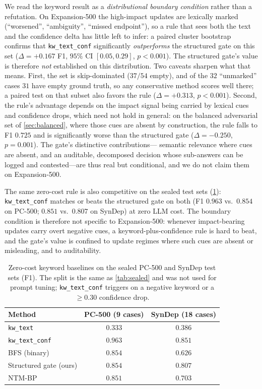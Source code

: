 \documentclass{article}
\theoremstyle{definition}
\begin{document}
We read the keyword result as a \emph{distributional boundary condition}
rather than a refutation.  On Expansion-500 the high-impact updates are
lexically marked (``worsened'', ``ambiguity'', ``missed endpoint''), so a
rule that sees both the text and the confidence delta has little left to
infer: a paired cluster bootstrap confirms that \texttt{kw\_text\_conf}
significantly \emph{outperforms} the structured gate on this set
($\Delta=+0.167$ F1, $95\%$ CI $[0.05,0.29]$, $p<0.001$).  The
structured gate's value is therefore \emph{not} established on this
distribution.  Two caveats sharpen what that means.  First, the set is
skip-dominated ($37/54$ empty), and of the $32$ ``unmarked'' cases $31$
have empty ground truth, so any conservative method scores well there; a
paired test on that subset also favors the rule ($\Delta=+0.313$,
$p<0.001$).  Second, the rule's advantage depends on the impact signal
being carried by lexical cues and confidence drops, which need not hold
in general: on the balanced adversarial set of \cref{sec:balanced},
where those cues are absent by construction, the rule falls to F1
$0.725$ and is significantly worse than the structured gate
($\Delta=-0.250$, $p=0.001$).  The gate's distinctive contributions---%
semantic relevance where cues are absent, and an auditable, decomposed
decision whose sub-answers can be logged and contested---are thus real
but conditional, and we do not claim them on Expansion-500.

The same zero-cost rule is also competitive on the sealed test sets
(\cref{tab:kwsealed}): \texttt{kw\_text\_conf} matches or beats the
structured gate on both (F1 $0.963$ vs.\ $0.854$ on PC-500; $0.851$
vs.\ $0.807$ on SynDep) at zero LLM cost.  The boundary condition is
therefore not specific to Expansion-500: whenever impact-bearing updates
carry overt negative cues, a keyword-plus-confidence rule is hard to
beat, and the gate's value is confined to update regimes where such
cues are absent or misleading, and to auditability.

\begin{table}[t]
\centering
\caption{Zero-cost keyword baselines on the sealed PC-500 and SynDep test
  sets (F1).  The split is the same as \cref{tab:sealed} and was not used
  for prompt tuning; \texttt{kw\_text\_conf} triggers on a negative
  keyword or a $\ge0.30$ confidence drop.}
\label{tab:kwsealed}
\begin{tabular}{lcc}
\toprule
Method & PC-500 (9 cases) & SynDep (18 cases) \\
\midrule
\texttt{kw\_text}       & $0.333$ & $0.386$ \\
\texttt{kw\_text\_conf} & $\mathbf{0.963}$ & $\mathbf{0.851}$ \\
BFS (binary)            & $0.854$ & $0.626$ \\
Structured gate (ours)  & $0.854$ & $0.807$ \\
NTM-BP                  & $0.851$ & $0.703$ \\
\bottomrule
\end{tabular}
\end{table}
\end{document}
